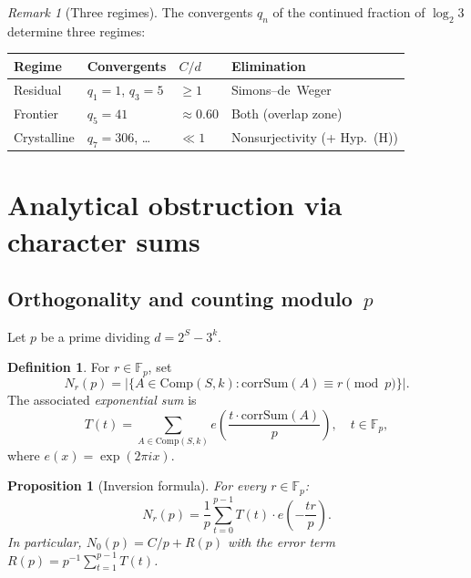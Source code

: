 \documentclass[12pt, a4paper]{amsart}
\theoremstyle{plain}
\newtheorem{proposition}[theorem]{Proposition}
\theoremstyle{definition}
\newtheorem{definition}[theorem]{Definition}
\theoremstyle{remark}
\newtheorem{remark}[theorem]{Remark}
\newcommand{\Fp}{\mathbb{F}_p}
\newcommand{\Comp}{\mathrm{Comp}}
\newcommand{\corrSum}{\mathrm{corrSum}}
\begin{document}
\begin{remark}[Three regimes]\label{rem:regimes}
  The convergents $q_n$ of the continued fraction of $\log_2 3$
  determine three regimes:
  \begin{center}
    \begin{tabular}{@{}llll@{}}
      \toprule
      Regime & Convergents & $C/d$ & Elimination \\
      \midrule
      Residual  & $q_1 = 1$, $q_3 = 5$ & $\geq 1$ &
        Simons--de~Weger \\
      Frontier  & $q_5 = 41$ & $\approx 0.60$ &
        Both (overlap zone) \\
      Crystalline & $q_7 = 306$, \ldots & $\ll 1$ &
        Nonsurjectivity (+ Hyp.~(H)) \\
      \bottomrule
    \end{tabular}
  \end{center}
\end{remark}

\section{Analytical obstruction via character sums}%
\label{sec:analytical}

\subsection{Orthogonality and counting modulo~$p$}

Let $p$ be a prime dividing $d = 2^S - 3^k$.

\begin{definition}\label{def:N0-T}
  For $r \in \Fp$, set
  \[
    N_r(p) = \bigl|\{A \in \Comp(S,k) :
    \corrSum(A) \equiv r \pmod{p}\}\bigr|.
  \]
  The associated \emph{exponential sum} is
  \[
    T(t) = \sum_{A \in \Comp(S,k)}
    e\!\left(\frac{t \cdot \corrSum(A)}{p}\right),
    \quad t \in \Fp,
  \]
  where $e(x) = \exp(2\pi i x)$.
\end{definition}

\begin{proposition}[Inversion formula]\label{prop:inversion}
  For every $r \in \Fp$:
  \[
    N_r(p) = \frac{1}{p}\sum_{t=0}^{p-1}
    T(t) \cdot e\!\left(-\frac{tr}{p}\right).
  \]
  In particular, $N_0(p) = C/p + R(p)$ with the error term
  $R(p) = p^{-1}\sum_{t=1}^{p-1} T(t)$.
\end{proposition}
\end{document}

